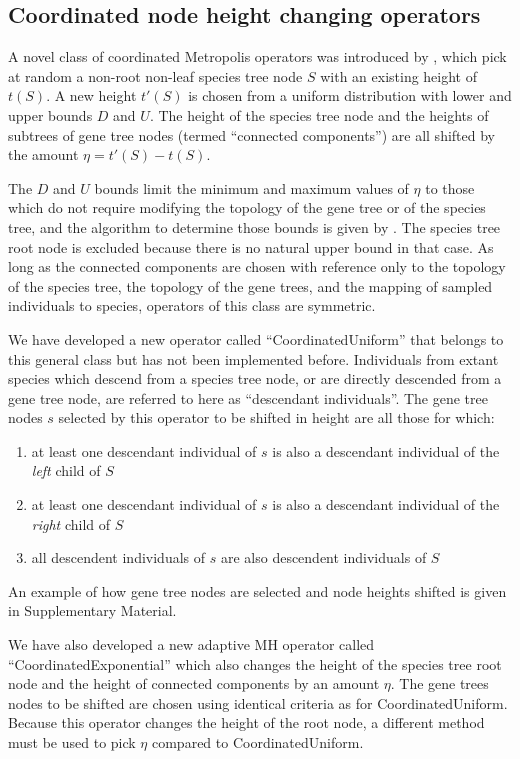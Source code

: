 \documentclass[12pt]{article}
\begin{document}
\subsection{Coordinated node height changing operators}

A novel class of coordinated Metropolis operators was introduced by
\cite{Jones2016}, which pick at random a non-root non-leaf species tree node
$S$ with an existing height of $t(S)$. A new height $t'(S)$ is chosen from a
uniform distribution with lower and upper bounds $D$ and $U$. The height of
the species tree node and the heights of subtrees of gene tree nodes (termed
``connected components'') are all shifted by the amount $\eta = t'(S) - t(S)$.

The $D$ and $U$ bounds limit the minimum and maximum values of $\eta$ to those
which do not require modifying the topology of the gene tree or of the species
tree, and the algorithm to determine those bounds is given by
\cite{Jones2016}. The species tree root node is excluded because there is no
natural upper bound in that case. As long as the connected components are
chosen with reference only to the topology of the species tree, the topology
of the gene trees, and the mapping of sampled individuals to species,
operators of this class are symmetric.

We have developed a new operator called ``CoordinatedUniform'' that belongs to
this general class but has not been implemented before. Individuals from
extant species which descend from a species tree node, or are directly
descended from a gene tree node, are referred to here as ``descendant
individuals''. The gene tree nodes ${s}$ selected by this operator to be
shifted in height are all those for which:

\begin{enumerate}
\item at least one descendant individual of $s$ is also a
descendant individual of the \textit{left} child of $S$
\item at least one descendant individual of $s$ is also a
descendant individual of the \textit{right} child of $S$
\item all descendent individuals of $s$ are also
descendent individuals of $S$
\end{enumerate}

An example of how gene tree nodes are selected and node heights shifted is
given in Supplementary Material.

We have also developed a new adaptive MH \citep{Andrieu2008} operator called
``CoordinatedExponential'' which also changes the height of the species tree
root node and the height of connected components by an amount $\eta$. The gene
trees nodes to be shifted are chosen using identical criteria as for
CoordinatedUniform. Because this operator changes the height of the root node,
a different method must be used to pick $\eta$ compared to CoordinatedUniform.
\end{document}

